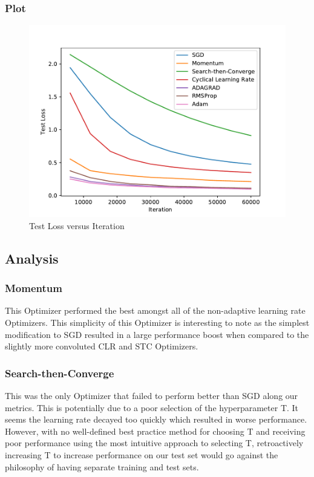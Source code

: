 \documentclass{article}
\begin{document}
\subsubsection{Plot}
\begin{figure}[H]
	\includegraphics[width=\textwidth, keepaspectratio]{TestLoss.pdf}
	\setlength{\belowcaptionskip}{0.0pt}	
	\caption{Test Loss versus Iteration}
\end{figure}

\subsection{Analysis}
\subsubsection{Momentum}
This Optimizer performed the best amongst all of the non-adaptive learning rate Optimizers. This simplicity of this Optimizer is interesting to note as the simplest modification to SGD resulted in a large performance boost when compared to the slightly more convoluted CLR and STC Optimizers.

\subsubsection{Search-then-Converge} 
This was the only Optimizer that failed to perform better than SGD along our metrics. This is potentially due to a poor selection of the hyperparameter T. It seems the learning rate decayed too quickly which resulted in worse performance. However, with no well-defined best practice method for choosing T and receiving poor performance using the most intuitive approach to selecting T, retroactively increasing T to increase performance on our test set would go against the philosophy of having separate training and test sets.
\end{document}
